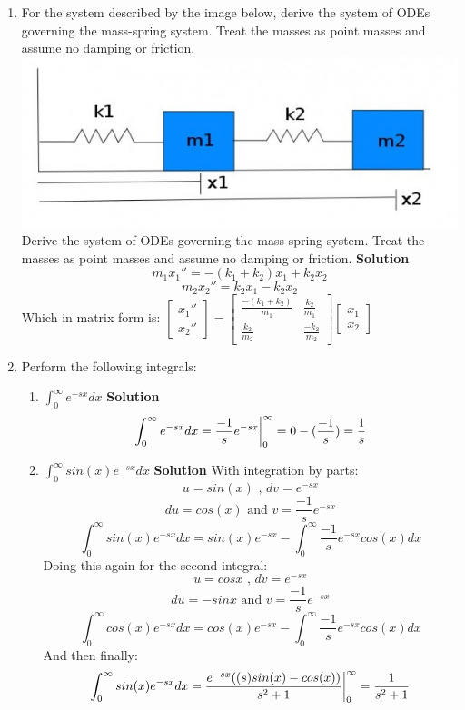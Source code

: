 \documentclass[letterpaper, fontsize=11pt]{scrartcl} %
\numberwithin{equation}{section} %
\numberwithin{figure}{section} %
\numberwithin{table}{section} %
\begin{document}
\begin{enumerate}
\item For the system described by the image below, derive the system of ODEs governing the mass-spring system. Treat the masses as point masses and assume no damping or friction.
\newline
\includegraphics[width=5in]{section8_1.jpg}
\newline
Derive the system of ODEs governing the mass-spring system. Treat the masses as point masses and assume no damping or friction. \newline
\textbf{Solution}
$$m_1x_1'' = -(k_1 + k_2)x_1 + k_2x_2$$ 
$$m_2x_2'' = k_2x_1 - k_2x_2$$
Which in matrix form is: $\left[ \begin{array}{c} x_1'' \\ x_2'' \end{array} \right]= \begin{bmatrix} \frac{-(k_1 + k_2)}{m_1} & \frac{k_2}{m_1} \\ \frac{k_2}{m_2} & \frac{-k_2}{m_2} \end{bmatrix} \left[ \begin{array}{c} x_1 \\ x_2 \end{array} \right] $%

\item Perform the following integrals:
\begin{enumerate}
\item $\int_{0}^{\infty}e^{-sx} dx$ \newline
\textbf{Solution} \newline
$$\int_{0}^{\infty}e^{-sx} dx =  \frac{-1}{s} e^{-sx} \bigg{|}_0^\infty = 0 - (\frac{-1}{s})  = \frac{1}{s}$$
\item $\int_{0}^{\infty}sin(x)e^{-sx} dx$ \newline
\textbf{Solution} \newline
With integration by parts: 
$$u = sin(x) \text{ , } dv = e^{-sx}$$
$$du = cos(x) \text{ and } v = \frac{-1}{s}e^{-sx}$$
$$\int_{0}^{\infty}sin(x)e^{-sx} dx =sin(x)e^{-sx} - \int_{0}^{\infty}\frac{-1}{s}e^{-sx}cos(x) dx $$
Doing this again for the second integral:
$$u = cos x \text{ , } dv = e^{-sx}$$
$$du = - sin x \text{ and } v = \frac{-1}{s}e^{-sx} $$
$$\int_{0}^{\infty}cos(x)e^{-sx} dx =cos(x)e^{-sx} - \int_{0}^{\infty}\frac{-1}{s}e^{-sx}cos(x) dx $$
And then finally:
$$\int_{0}^{\infty}sin(x)e^{-sx} dx = \frac{ e^{-sx}((s)sin(x) - cos(x))}{s^2 + 1} \bigg{|}_0^\infty = \frac{1}{s^2 + 1}$$


\end{enumerate}
\end{enumerate}
\end{document}

